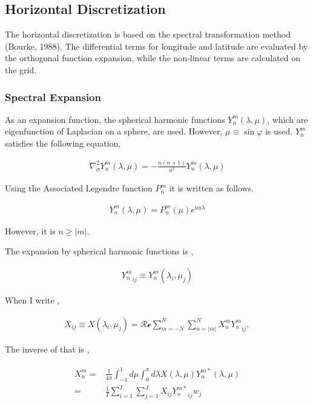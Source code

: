 \hypertarget{horizontal-discretization}{%
\subsection{Horizontal Discretization}\label{horizontal-discretization}}

The horizontal discretization is based on the spectral transformation method (Bourke, 1988). The differential terms for longitude and latitude are evaluated by the orthogonal function expansion, while
the non-linear terms are calculated on the grid.

\hypertarget{spectral-expansion}{%
\subsubsection{Spectral Expansion}\label{spectral-expansion}}

As an expansion function, the spherical harmonic functions \(Y_n^m(\lambda,\mu)\), which are eigenfunction of Laplacian on a sphere, are used. However, \(\mu \equiv \sin\varphi\) is used. \(Y_n^m\)
satisfies the following equation,

\begin{eqnarray}
\nabla^{2}_{\sigma} Y_n^m(\lambda,\mu)
= - \frac{n(n+1)}{a^{2}} Y_n^m(\lambda,\mu)
\end{eqnarray}

Using the Associated Legendre function \(P_n^m\) it is written as follows.

\begin{eqnarray}
Y_n^m(\lambda,\mu) = P_n^m (\mu) e^{\mathrm{i}m \lambda}
\end{eqnarray}

However, it is \(n \geq | m |\).

The expansion by spherical harmonic functions is ,

\begin{eqnarray}
   {Y_n^m}_{ij} \equiv Y_n^m ( \lambda_i, \mu_j )
\end{eqnarray}

When I write ,

\begin{eqnarray}
  X_{ij} \equiv X ( \lambda_i, \mu_j )
   =  \mathcal{Re} \sum_{m=-N}^{N} \sum_{n=|m|}^{N}
        X_n^m {Y_n^m}_{ij} ,
\end{eqnarray}

The inverse of that is ,

\begin{eqnarray}
\begin{aligned}
  X_n^m
         = & \frac{1}{4 \pi}
             \int_{-1}^{1} d \mu \int_{0}^{\pi} d \lambda
               X( \lambda, \mu ) Y_n^{m *} ( \lambda, \mu ) \\
         = & \frac{1}{I} \sum_{i=1}^{I} \sum_{j=1}^{J}
               X_{ij} {Y_n^{m*}}_{ij} w_j
\end{aligned}
\end{eqnarray}

